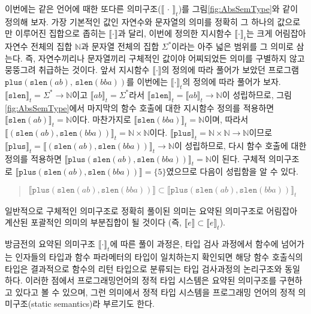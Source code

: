 이번에는 같은 언어에 때한 또다른 의미구조($\llbracket\,\cdot\,\rrbracket_t$)를
그림\;\ref{fig:AbsSemType}와 같이 정의해 보자. 가장 기본적인 값인 자연수와
문자열의 의미를 정확히 그 하나의 값으로만 이루어진 집합으로 좁히는
$\llbracket\cdot\rrbracket$과 달리, 이번에 정의한 지시함수
$\llbracket\cdot\rrbracket_t$는 크게 어림잡아 자연수 전체의 집합 $\mathbb{N}$과
문자열 전체의 집합 $\Sigma^{*}$이라는 아주 넓은 범위를 그 의미로 삼는다.
즉, 자연수끼리나 문자열끼리 구체적인 값이야 어찌되었든 의미를 구별하지 않고
뭉뚱그려 취급하는 것이다. 앞서 지시함수 $\llbracket\cdot\rrbracket$의 정의에 따라
풀어가 보았던 프로그램 $\texttt{plus}(\texttt{slen}(ab),\,\texttt{slen}(bba))$를
이번에는 $\llbracket\cdot\rrbracket_t$의 정의에 따라 풀어가 보자.
$\llbracket\texttt{slen}\rrbracket_t = \Sigma^{*}\to\mathbb{N}$이고
$\llbracket ab\rrbracket_t = \Sigma^{*}$라서
$\llbracket\texttt{slen}\rrbracket_t = \llbracket ab\rrbracket_t \to \mathbb{N}$이
성립하므로, 그림\;\ref{fig:AbsSemType}에서 마지막의 함수 호출에 대한 지시함수
정의를 적용하면 $\llbracket\texttt{slen}(ab)\rrbracket_t = \mathbb{N}$이다.
마찬가지로 $\llbracket\texttt{slen}(bba)\rrbracket_t = \mathbb{N}$이며,
따라서 $\llbracket(\texttt{slen}(ab),\texttt{slen}(bba))\rrbracket_t
                      = \mathbb{N} \times \mathbb{N}$이다.
$\llbracket\texttt{plus}\rrbracket_t = \mathbb{N}\times\mathbb{N}\to\mathbb{N}$이므로
$\llbracket\texttt{plus}\rrbracket_t
 = \llbracket(\texttt{slen}(ab),\texttt{slen}(bba))\rrbracket_t\to\mathbb{N}$이
성립하므로, 다시 함수 호출에 대한 정의를 적용하면
$\llbracket\texttt{plus}(\texttt{slen}(ab),\texttt{slen}(bba))\rrbracket_t 
 = \mathbb{N}$이 된다. 구체적 의미구조로
 $\llbracket\texttt{plus}(\texttt{slen}(ab),\texttt{slen}(bba))\rrbracket
 = \{5\}$였으므로 다음이 성립함을 알 수 있다.\vspace*{-1ex}
\begin{quote}
$\llbracket\texttt{plus}(\texttt{slen}(ab),\texttt{slen}(bba))\rrbracket \subset
 \llbracket\texttt{plus}(\texttt{slen}(ab),\texttt{slen}(bba))\rrbracket_t$
\vspace*{-1ex}
\end{quote} 
일반적으로 구체적인 의미구조로 정확히 풀이된 의미는 요약된 의미구조로
어림잡아 계산된 포괄적인 의미의 부분집합이 될 것이다
(즉, $\llbracket e\rrbracket \subset \llbracket e\rrbracket_t$).
 
방금전의 요약된 의미구조 $\llbracket\cdot\rrbracket_t$에 따른 풀이 과정은,
타입 검사 과정에서 함수에 넘어가는 인자들의 타입과 함수 파라메터의 타입이
일치하는지 확인되면 해당 함수 호출식의 타입은 결과적으로 함수의 리턴 타입으로
분류되는 타입 검사과정의 논리구조와 동일하다. 이러한 점에서 프로그래밍언어의
정적 타입 시스템은 요약된 의미구조를 구현하고 있다고 볼 수 있으며, 그런
의미에서 정적 타입 시스템을 프로그래밍 언어의 정적 의미구조(static semantics)라
부르기도 한다.

